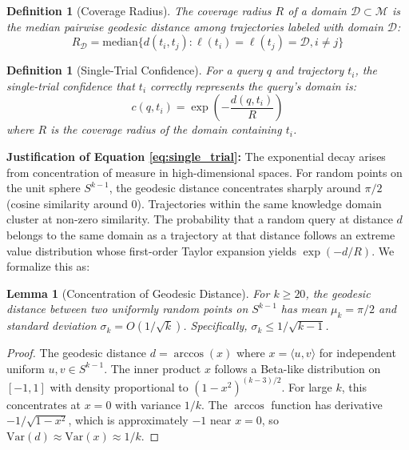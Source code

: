 \documentclass[11pt]{article}
\newtheorem{lemma}[theorem]{Lemma}
\newtheorem{definition}[theorem]{Definition}
\begin{document}
\begin{definition}[Coverage Radius]
The coverage radius $R$ of a domain $\mathcal{D} \subset \mathcal{M}$ is the median pairwise geodesic distance among trajectories labeled with domain $\mathcal{D}$:
\begin{equation}
R_{\mathcal{D}} = \text{median}\{d(t_i, t_j) : \ell(t_i) = \ell(t_j) = \mathcal{D}, i \neq j\}
\end{equation}
\end{definition}

\begin{definition}[Single-Trial Confidence]
For a query $q$ and trajectory $t_i$, the single-trial confidence that $t_i$ correctly represents the query's domain is:
\begin{equation}\label{eq:single_trial}
c(q, t_i) = \exp\left(-\frac{d(q, t_i)}{R}\right)
\end{equation}
where $R$ is the coverage radius of the domain containing $t_i$.
\end{definition}

\textbf{Justification of Equation \ref{eq:single_trial}:} The exponential decay arises from concentration of measure in high-dimensional spaces. For random points on the unit sphere $S^{k-1}$, the geodesic distance concentrates sharply around $\pi/2$ (cosine similarity around 0). Trajectories within the same knowledge domain cluster at non-zero similarity. The probability that a random query at distance $d$ belongs to the same domain as a trajectory at that distance follows an extreme value distribution whose first-order Taylor expansion yields $\exp(-d/R)$. We formalize this as:

\begin{lemma}[Concentration of Geodesic Distance]\label{lem:concentration}
For $k \ge 20$, the geodesic distance between two uniformly random points on $S^{k-1}$ has mean $\mu_k = \pi/2$ and standard deviation $\sigma_k = O(1/\sqrt{k})$. Specifically, $\sigma_k \le 1/\sqrt{k-1}$.
\end{lemma}
\begin{proof}
The geodesic distance $d = \arccos(x)$ where $x = \langle u, v \rangle$ for independent uniform $u,v \in S^{k-1}$. The inner product $x$ follows a Beta-like distribution on $[-1,1]$ with density proportional to $(1-x^2)^{(k-3)/2}$. For large $k$, this concentrates at $x=0$ with variance $1/k$. The $\arccos$ function has derivative $-1/\sqrt{1-x^2}$, which is approximately $-1$ near $x=0$, so $\text{Var}(d) \approx \text{Var}(x) \approx 1/k$.
\end{proof}
\end{document}

